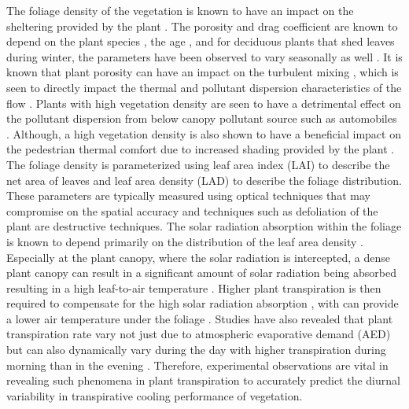 The foliage density of the vegetation is known to have an impact on the sheltering provided by the plant \citep{Bitog2012,Bitog2011,Guan2003,Manickathan2018b}. The porosity and drag coefficient are known to depend on the plant species \citep{Cao2012,Manickathan2018b,Vollsinger2005a,Vollsinger2005}, the age \citep{Dahle2010}, and for deciduous plants that shed leaves during winter, the parameters have been observed to vary seasonally as well \citep{Dellwik2019,Hwang2011,Maass1995}. It is known that plant porosity can have an impact on the turbulent mixing \citep{Bai2012,Hiraoka2008,Manickathan2018b,McClure2017}, which is seen to directly impact the thermal and pollutant dispersion characteristics of the flow \citep{Conan2015,Gromke2008,Gromke2015a,Gromke2008a}. Plants with high vegetation density are seen to have a detrimental effect on the pollutant dispersion from below canopy pollutant source such as automobiles \citep{Nowak2006}. Although, a high vegetation density is also shown to have a beneficial impact on the pedestrian thermal comfort due to increased shading provided by the plant \citep{Hwang2011,Morakinyo2017,Ng2012}. The foliage density is parameterized using leaf area index (LAI) to describe the net area of leaves and leaf area density (LAD) to describe the foliage distribution. These parameters are typically measured using optical techniques \citep{Cao2012,Grant1998,Guan2003,Liu2018,Manickathan2018b,Phattaralerphong2005} that may compromise on the spatial accuracy and techniques such as defoliation of the plant \citep{Jonckheere2004,ONeal2002} are destructive techniques. The solar radiation absorption within the foliage is known to depend primarily on the distribution of the leaf area density \citep{Kichah2012,Manickathan2018a,Park2018}. Especially at the plant canopy, where the solar radiation is intercepted, a dense plant canopy can result in a significant amount of solar radiation being absorbed resulting in a high leaf-to-air temperature \citep{Hiraoka2005,Leuzinger2007,Manickathan2018a}. Higher plant transpiration is then required to compensate for the high solar radiation absorption \citep{Manickathan2018b}, with can provide a lower air temperature under the foliage \citep{Wong2003}. Studies have also revealed that plant transpiration rate vary not just due to atmospheric evaporative demand (AED) \citep{Kichah2012,Manickathan2018a,McVicar2012,Tuzet2003} but can also dynamically vary during the day with higher transpiration during morning than in the evening \citep{Huang2017,Tuzet2003}. Therefore, experimental observations are vital in revealing such phenomena in plant transpiration to accurately predict the diurnal variability in transpirative cooling performance of vegetation.

